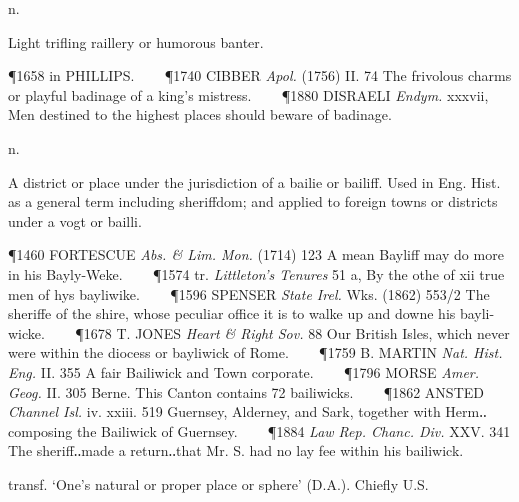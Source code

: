 \begin{description}[wide, labelwidth=!, labelindent=0pt] %

 n.

\noindent {}


\noindent
Light trifling raillery or humorous banter.

\P 1658 in PHILLIPS.    
\P 1740 CIBBER  \textit{Apol.} (1756) II. 74 The frivolous charms or playful badinage of a king's mistress.    
\P 1880 DISRAELI  \textit{Endym.} xxxvii, Men destined to the highest places should beware of badinage.



 n.

\noindent {}

\vspace{-0.3cm}

\begin{myenumerate}

 A district or place under the jurisdiction of a bailie or bailiff. Used in Eng. Hist. as a general term including sheriffdom; and applied to foreign towns or districts under a vogt or bailli.

\P 1460 FORTESCUE  \textit{Abs. \& Lim. Mon.} (1714) 123 A mean Bayliff may do more in his Bayly-Weke.    
\P 1574 tr. \textit{Littleton's Tenures} 51 a, By the othe of xii true men of hys bayliwike.    
\P 1596 SPENSER  \textit{State Irel.} Wks. (1862) 553/2 The sheriffe of the shire, whose peculiar office it is to walke up and downe his bayli-wicke.    
\P 1678 T. JONES  \textit{Heart \& Right Sov.} 88 Our British Isles, which never were within the diocess or bayliwick of Rome.    
\P 1759 B. MARTIN  \textit{Nat. Hist. Eng.} II. 355 A fair Bailiwick and Town corporate.    
\P 1796 MORSE  \textit{Amer. Geog.} II. 305 Berne. This Canton contains 72 bailiwicks.    
\P 1862 ANSTED  \textit{Channel Isl.} iv. xxiii. 519 Guernsey, Alderney, and Sark, together with Herm‥composing the Bailiwick of Guernsey.    
\P 1884 \textit{Law Rep. Chanc. Div.} XXV. 341 The sheriff‥made a return‥that Mr. S. had no lay fee within his bailiwick.

 transf. ‘One's natural or proper place or sphere’ (D.A.). Chiefly U.S.


\end{myenumerate}
\end{description}
